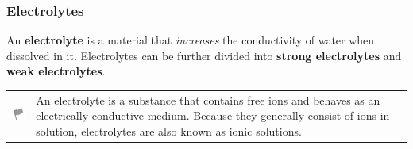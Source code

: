             \subsubsection{ Electrolytes}
            \nopagebreak
        \label{m38720*id338650}An \textbf{electrolyte} is a material that \textsl{increases} the conductivity of water when dissolved in it. Electrolytes can be further divided into \textbf{strong electrolytes} and \textbf{weak electrolytes}.\par 
\label{m38720*fhsst!!!underscore!!!id641}\begin{definition}
	  \begin{tabular*}{15 cm}{m{15 mm}m{}}
	\hspace*{-50pt}  \includegraphics[width=0.5in]{col11305.imgs/psflag2.png}   & \Definition{   \label{id2491564}\textbf{ Electrolyte }} { \label{m38720*meaningfhsst!!!underscore!!!id641}
        An electrolyte is a substance that contains free ions and behaves as an electrically conductive medium. Because they generally consist of ions in solution, electrolytes are also known as ionic solutions. 
         } 
      \end{tabular*}
      \end{definition}
